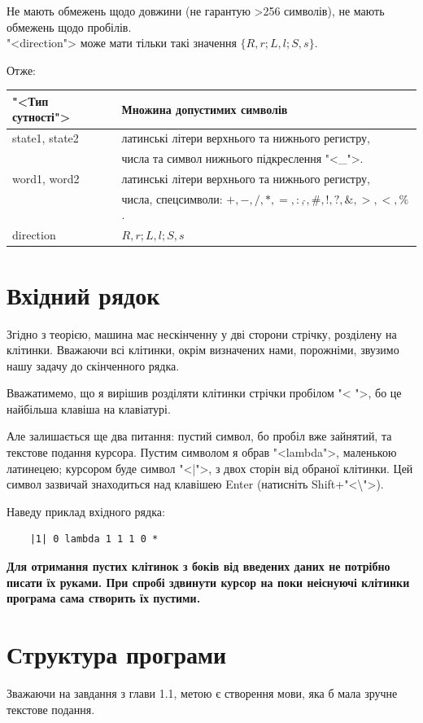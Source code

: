 \documentclass[oneside,final,14pt]{extreport}
\begin{document}
Не мають обмежень щодо довжини (не гарантую >256 символів), не мають обмежень щодо пробілів.
\\
"<direction">  може мати тільки такі значення $\{R,r;L,l;S,s\}$.

Отже:
		
\vspace{0.2cm}
		
\begin{tabular}{ | l | l | }
	\hline
	"<Тип сутності"> & Множина допустимих символів \\ \hline
	state1, state2 & латинські літери верхнього та нижнього регистру,\\
	& числа та символ нижнього підкреслення "<\_">. \\
	\hline
	word1, word2 & латинські літери верхнього та нижнього регистру,\\ 
	& числа, спецсимволи: $+,-,/,*,=,:,\hat{},\#,!,?,\&,>,<,\%$.  \\
	\hline
	direction & $R,r;L,l;S,s$ \\
	\hline
\end{tabular}

\section{Вхідний рядок}
Згідно з теорією, машина має нескінченну у дві сторони стрічку, розділену на клітинки. Вважаючи всі клітинки, окрім визначених нами, порожніми, звузимо нашу задачу до скінченного рядка.

Вважатимемо, що я вирішив розділяти клітинки стрічки пробілом "< ">, бо це найбільша клавіша на клавіатурі. 

Але залишається ще два питання: пустий символ, бо пробіл вже зайнятий, та текстове подання курсора. Пустим символом я обрав "<lambda">, маленькою латинецею; курсором буде символ "<|">, з двох сторін від обраної клітинки. Цей символ зазвичай знаходиться над клавішею Enter (натисніть Shift+"<\textbackslash{}">).

Наведу приклад вхідного рядка:
\begin{verbatim}
	|1| 0 lambda 1 1 1 0 *
\end{verbatim}

{\bfseries Для отримання пустих клітинок з боків від введених даних не потрібно писати їх руками. При спробі здвинути курсор на поки неіснуючі клітинки програма сама створить їх пустими.}

\section{Структура програми}
Зважаючи на завдання з глави 1.1, метою є створення мови, яка б мала зручне текстове подання.
\end{document}

